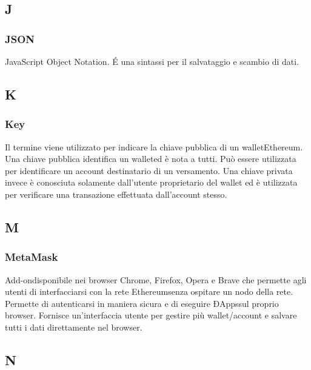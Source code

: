 \subsection*{J}

\subsubsection*{JSON}
JavaScript Object Notation. \'E una sintassi per il salvataggio e scambio di dati.


\subsection*{K}

\subsubsection*{Key}
Il termine viene utilizzato per indicare la chiave pubblica di un wallet\glosp Ethereum\glosp. Una chiave pubblica identifica un wallet\glosp ed è nota a tutti. Può essere utilizzata per identificare un account destinatario di un versamento. Una chiave privata invece è conosciuta solamente dall'utente proprietario del wallet ed è utilizzata per verificare una transazione effettuata dall'account stesso. 


\subsection*{M}

\subsubsection*{MetaMask}
Add-on\glosp disponibile nei browser Chrome, Firefox, Opera e Brave che permette agli utenti di interfacciarsi con la rete Ethereum\glosp senza ospitare un nodo della rete. Permette di autenticarsi in maniera sicura e di eseguire ÐApps\glosp sul proprio browser. Fornisce un'interfaccia utente per gestire più wallet/account e salvare tutti i dati direttamente nel browser. 

\subsection*{N}

